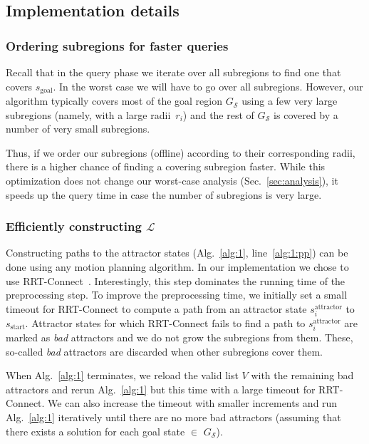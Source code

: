 \documentclass[letterpaper]{article} %
\newcommand{\calL}{\ensuremath{\mathcal{L}}\xspace}
\newcommand{\calS}{\ensuremath{\mathcal{S}}\xspace}
\newcommand{\sAttract}{\ensuremath{s^{\text{attractor}}_i}\xspace}
\newcommand{\sStart}{\ensuremath{s_{\text{start}}\xspace}}
\newcommand{\sGoal}{\ensuremath{s_{\text{goal}}\xspace}}
\begin{document}
\subsection{Implementation details}
\label{subsec:impl}

\subsubsection{Ordering subregions for faster queries}
Recall that in the query phase we iterate over all subregions to find one that covers \sGoal. 
In the worst case we will have to go over all subregions.
However,  our algorithm typically covers most of the goal region $G_\calS$ using a few very large subregions (namely, with a large radii~$r_i$) and the rest of $G_\calS$ is covered by a number of very small subregions.

Thus, if we order our subregions (offline) according to their corresponding radii, there is a higher chance of finding a covering subregion faster. While this optimization does not change our worst-case analysis (Sec.~\ref{sec:analysis}), it speeds up the query time in case the number of subregions is very large.

\subsubsection{Efficiently constructing $\calL$}
Constructing paths to the attractor states (Alg.~\ref{alg:1}, line~\ref{alg:1:pp}) can be done using any motion planning algorithm.
In our implementation we chose to use \textsf{RRT-Connect}~\cite{KL00}.
Interestingly, this step dominates the running time of the preprocessing step.
%
To improve the preprocessing time, we initially set a small timeout for \textsf{RRT-Connect} to compute a path from an attractor state $\sAttract$ to $\sStart$.
Attractor states for which \textsf{RRT-Connect} fails to find a path to $\sAttract$ are marked as \textit{bad} attractors and we do not grow the subregions from them. 
These, so-called \textit{bad} attractors are discarded when other subregions cover them.

When Alg.~\ref{alg:1} terminates, we reload the valid list $V$ with the remaining bad attractors and rerun Alg.~\ref{alg:1} but this time with a large timeout for \textsf{RRT-Connect}. 
%
We can also increase the timeout with smaller increments and run Alg.~\ref{alg:1} iteratively until there are no more bad attractors (assuming that there exists a solution for each goal state $\in$ $G_\calS$).
\end{document}
